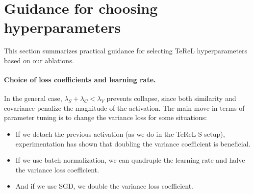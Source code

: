 \section{Guidance for choosing hyperparameters}
\label{app:hyperparam-guidance}

This section summarizes practical guidance for selecting TeReL hyperparameters based on our ablations.

\paragraph{Choice of loss coefficients and learning rate.}
In the general case, $\lambda_S+\lambda_C<\lambda_V$ prevents collapse, since both similarity and covariance penalize the magnitude of the activation.
The main move in terms of parameter tuning is to change the variance loss for some situations:
\begin{itemize}
    \item If we detach the previous activation (as we do in the TeReL-S setup), experimentation has shown that doubling the variance coefficient is beneficial.
    \item If we use batch normalization, we can quadruple the learning rate and halve the variance loss coefficient.
    \item And if we use SGD, we double the variance loss coefficient.
\end{itemize}
